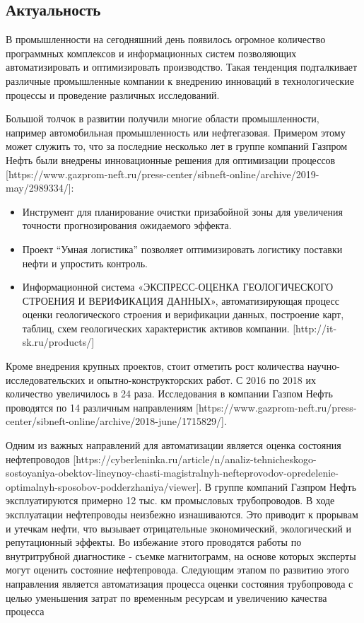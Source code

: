 \documentclass[a4paper,article,14pt]{extarticle}
\begin{document}


\tableofcontents
\pagebreak

\subsection{Актуальность}
В промышленности на сегодняшний день появилось огромное количество программных комплексов и 
информационных систем позволяющих автоматизировать и оптимизировать производство. 
Такая тенденция подталкивает различные промышленные компании к внедрению инноваций 
в технологические процессы и проведение различных исследований. 

Большой толчок в развитии получили многие области промышленности, например автомобильная промышленность или нефтегазовая. 
Примером этому может служить то, что за последние несколько лет в группе компаний Газпром Нефть были 
внедрены инновационные решения для оптимизации процессов [https://www.gazprom-neft.ru/press-center/sibneft-online/archive/2019-may/2989334/]:
\begin{itemize}
    \item Инструмент для планирование очистки призабойной зоны для увеличения точности прогнозирования ожидаемого эффекта.
    \item Проект “Умная логистика” позволяет оптимизировать логистику поставки нефти и упростить контроль.
    \item Информационной система «ЭКСПРЕСС-ОЦЕНКА ГЕОЛОГИЧЕСКОГО СТРОЕНИЯ И ВЕРИФИКАЦИЯ ДАННЫХ», 
    автоматизирующая процесс оценки геологического строения и верификации данных, построение карт, 
    таблиц, схем геологических характеристик активов компании. [http://it-sk.ru/products/]	
\end{itemize}

Кроме внедрения крупных проектов, стоит отметить рост количества научно-исследовательских и опытно-конструкторских работ. 
С 2016 по 2018 их количество увеличилось в 24 раза. Исследования в компании 
Газпом Нефть проводятся по 14 различным направлениям [https://www.gazprom-neft.ru/press-center/sibneft-online/archive/2018-june/1715829/].

Одним из важных направлений для автоматизации является оценка состояния нефтепроводов 
[https://cyberleninka.ru/article/n/analiz-tehnicheskogo-sostoyaniya-obektov-lineynoy-chasti-magistralnyh-nefteprovodov-opredelenie-optimalnyh-sposobov-podderzhaniya/viewer]. 
В группе компаний Газпром Нефть эксплуатируются примерно 12 тыс. км промысловых трубопроводов. В ходе эксплуатации нефтепроводы неизбежно изнашиваются. 
Это приводит к прорывам и утечкам нефти, что вызывает отрицательные экономический, экологический и репутационный эффекты. 
Во избежание этого проводятся работы по внутритрубной диагностике - съемке магнитограмм, на основе которых эксперты могут оценить состояние нефтепровода. 
Следующим этапом по развитию этого направления является автоматизация процесса оценки состояния трубопровода 
с целью уменьшения затрат по временным ресурсам и увеличению качества процесса
\end{document}
